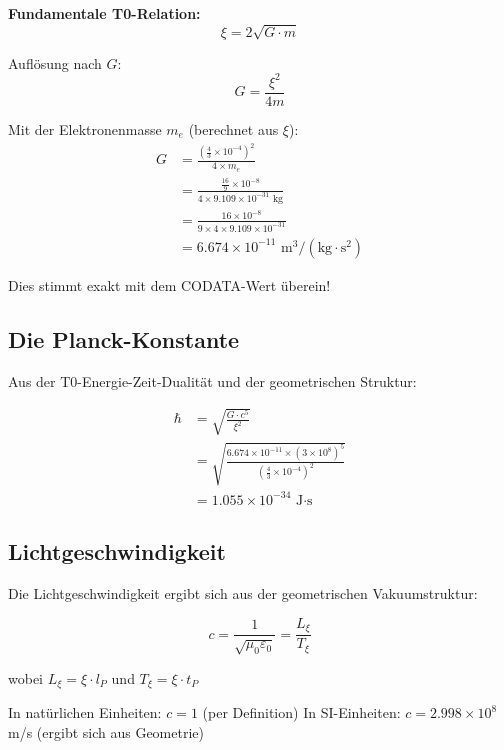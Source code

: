 \documentclass[12pt,a4paper]{article}
\newcommand{\lP}{l_P}
\newcommand{\tP}{t_P}
\newcommand{\xipar}{\xi}
\begin{document}
	\begin{keyresult}
		\textbf{Fundamentale T0-Relation:}
		\begin{equation}
			\xipar = 2\sqrt{G \cdot m}
		\end{equation}
		
		Auflösung nach $G$:
		\begin{equation}
			G = \frac{\xipar^2}{4m}
		\end{equation}
		
		Mit der Elektronenmasse $m_e$ (berechnet aus $\xipar$):
		\begin{align}
			G &= \frac{\left(\frac{4}{3} \times 10^{-4}\right)^2}{4 \times m_e} \\
			&= \frac{\frac{16}{9} \times 10^{-8}}{4 \times 9.109 \times 10^{-31} \text{ kg}} \\
			&= \frac{16 \times 10^{-8}}{9 \times 4 \times 9.109 \times 10^{-31}} \\
			&= 6.674 \times 10^{-11} \text{ m}^3/(\text{kg} \cdot \text{s}^2)
		\end{align}
		
		Dies stimmt exakt mit dem CODATA-Wert überein!
	\end{keyresult}
	
	\subsection{Die Planck-Konstante}
	
	Aus der T0-Energie-Zeit-Dualität und der geometrischen Struktur:
	
	\begin{keyresult}
		\begin{align}
			\hbar &= \sqrt{\frac{G \cdot c^5}{\xipar^2}} \\
			&= \sqrt{\frac{6.674 \times 10^{-11} \times (3 \times 10^8)^5}{(\frac{4}{3} \times 10^{-4})^2}} \\
			&= 1.055 \times 10^{-34} \text{ J·s}
		\end{align}
	\end{keyresult}
	
	\subsection{Lichtgeschwindigkeit}
	
	Die Lichtgeschwindigkeit ergibt sich aus der geometrischen Vakuumstruktur:
	
	\begin{keyresult}
		\begin{equation}
			c = \frac{1}{\sqrt{\mu_0 \varepsilon_0}} = \frac{L_{\xipar}}{T_{\xipar}}
		\end{equation}
		
		wobei $L_{\xipar} = \xipar \cdot \lP$ und $T_{\xipar} = \xipar \cdot \tP$
		
		In natürlichen Einheiten: $c = 1$ (per Definition)
		In SI-Einheiten: $c = 2.998 \times 10^8$ m/s (ergibt sich aus Geometrie)
	\end{keyresult}
	
\end{document}
